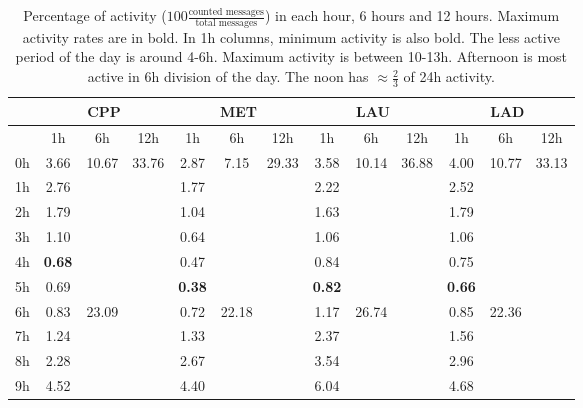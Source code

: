 \documentclass[%
 aip,
 jmp,%
 amsmath,amssymb,
 reprint,%
]{revtex4-1}
\begin{document}
\begin{table}
    \caption{Percentage of activity ($100\frac{\text{counted messages}}{\text{total messages}}$) in each hour, 6 hours and 12 hours. Maximum activity rates are in bold. In 1h columns, minimum activity is also bold. The less active period of the day is around 4-6h. Maximum activity is between 10-13h. Afternoon is most active in 6h division of the day. The noon has $\approx \frac{2}{3}$ of 24h activity. }\label{dia}
\begin{center}
    \begin{tabular}{ |l|| c|c|c| c|c|c| c|c|c| c|c|c|}
        \hline
    & \multicolumn{3}{c|}{CPP} & \multicolumn{3}{c|}{MET} & \multicolumn{3}{c|}{LAU} & \multicolumn{3}{c|}{LAD}  \\ \hline
    & 1h   & 6h & 12h &   1h & 6h & 12h &   1h & 6h & 12h &   1h & 6h & 12h \\ \hline\hline
0h  & 3.66 & \multirow{6}{*}{10.67} & \multirow{12}{*}{33.76} & 2.87  & \multirow{6}{*}{7.15} & \multirow{12}{*}{29.33} & 3.58 & \multirow{6}{*}{10.14} &  \multirow{12}{*}{36.88} & 4.00 & \multirow{6}{*}{10.77} & \multirow{12}{*}{33.13} \\
1h  & 2.76 &                        &                         & 1.77  & & &  2.22 & & & 2.52 & & \\
2h  & 1.79 &                        &                         & 1.04  & & & 1.63 & & & 1.79 & & \\
3h  & 1.10 &                        &                         & 0.64  & & & 1.06 & & & 1.06 & & \\
4h  & {\bf 0.68} &                        &                         & 0.47  & & &  0.84 & & & 0.75 & & \\
5h  & 0.69 &                        &                         & {\bf 0.38}  & & & {\bf 0.82} & & & {\bf 0.66} & & \\\cline{3-3}\cline{6-6}\cline{9-9}\cline{12-12}
6h  & 0.83 & \multirow{6}{*}{23.09} &                         & 0.72  & \multirow{6}{*}{22.18} & & 1.17 & \multirow{6}{*}{26.74} & & 0.85 & \multirow{6}{*}{22.36} &  \\
7h  & 1.24 &                        &                         & 1.33  & & & 2.37 & & & 1.56 & & \\
8h  & 2.28 &                        &                         & 2.67  & & & 3.54 & & & 2.96 & & \\
9h  & 4.52 &                        &                         & 4.40  & & & 6.04 & & & 4.68 & & \\

\end{tabular}
\end{center}
\end{table}
\end{document}
